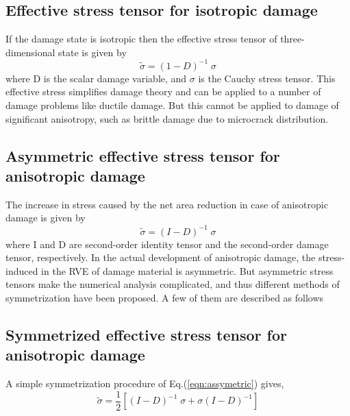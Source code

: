 \documentclass[12pt,a4paper,twoside,openright]{report}
\begin{document}
\subsection{Effective stress tensor for isotropic damage \citep{lemaitre1978aspect}}
\indent\indent\indent If the damage state is isotropic then the effective stress tensor of three-dimensional state is given by
\begin{equation}
\tilde{\sigma} = (1 - D)^{-1} \; \sigma
\end{equation}
where D is the scalar damage variable, and $\sigma$ is the Cauchy stress tensor. This effective stress simplifies damage theory and can be applied to a number of damage problems like ductile damage. But this cannot be applied to damage of significant anisotropy, such as brittle damage due to microcrack distribution.\\
\subsection{Asymmetric effective stress tensor for anisotropic damage \citep{murakami2012continuum}}
\indent\indent\indent The increase in stress caused by the net area reduction in case of anisotropic damage is given by
\begin{equation}
\tilde{\sigma} = (I - D)^{-1} \; \sigma
\label{eqn:assymetric}
\end{equation}
where I and D are second-order identity tensor and the second-order damage tensor, respectively. In the actual development of anisotropic damage, the stress-induced in the RVE of damage material is asymmetric. But asymmetric stress tensors make the numerical analysis complicated, and thus different methods of symmetrization have been proposed. A few of them are described as follows

\subsection{Symmetrized effective stress tensor for anisotropic damage \citep{murakami2012continuum}} 
\indent\indent\indent A simple symmetrization procedure of Eq.(\ref{eqn:assymetric}) gives,
\begin{equation}
\label{eqn: Murakami and Ohno}
\tilde{\sigma} = \frac{1}{2} [(I - D)^{-1}\;\sigma + \sigma(I - D)^{-1}]
\end{equation}
\end{document}
